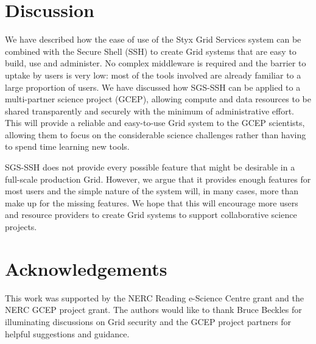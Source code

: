 \documentclass[a4paper]{article}
\begin{document}
\begin{multicols}{2}
\section{Discussion}
We have described how the ease of use of the Styx Grid Services system can be combined with the Secure Shell (SSH) to create Grid systems that are easy to build, use and administer.  No complex middleware is required and the barrier to uptake by users is very low: most of the tools involved are already familiar to a large proportion of users.  We have discussed how SGS-SSH can be applied to a multi-partner science project (GCEP), allowing compute and data resources to be shared transparently and securely with the minimum of administrative effort.  This will provide a reliable and easy-to-use Grid system to the GCEP scientists, allowing them to focus on the considerable science challenges rather than having to spend time learning new tools.

SGS-SSH does not provide every possible feature that might be desirable in a full-scale production Grid.  However, we argue that it provides enough features for most users and the simple nature of the system will, in many cases, more than make up for the missing features.  We hope that this will encourage more users and resource providers to create Grid systems to support collaborative science projects.

\section*{Acknowledgements}
This work was supported by the NERC Reading e-Science Centre grant and the NERC GCEP project grant.  The authors would like to thank Bruce Beckles for illuminating discussions on Grid security and the GCEP project partners for helpful suggestions and guidance.

\end{multicols}



\end{document}
